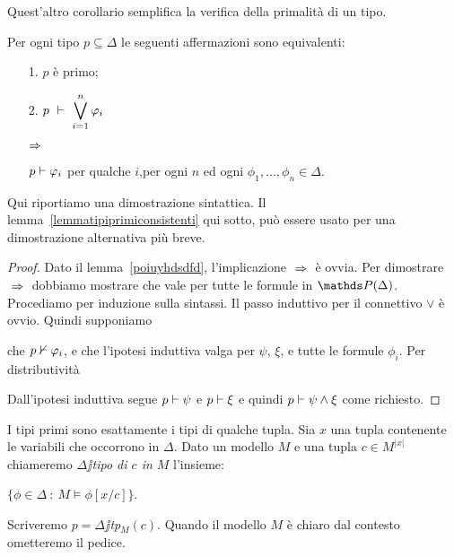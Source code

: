 Quest'altro corollario semplifica la verifica della primalit\`a di un tipo.


\begin{corollary}\label{lemma_primo_vs_completo}
Per ogni tipo $p\subseteq\Delta$ le seguenti affermazioni sono equivalenti:
\begin{itemize}
\item[1.] $p$ \`e primo;
\item[2.] $\displaystyle p\ \proves\ \bigvee^n_{i=1}\phi_i$\parbox{6ex}{\hfil$\Rightarrow$}$p\vdash\varphi_i$ per qualche $i$,\hfill per ogni $n$ ed ogni $\phi_1,\dots,\phi_n\in\Delta$.
\end{itemize}
\end{corollary}
Qui riportiamo una dimostrazione sintattica. Il lemma~\ref{lemmatipiprimiconsistenti} qui sotto, pu\`o essere usato per una dimostrazione alternativa pi\`u breve.
\begin{proof} Dato il lemma~\ref{poiuyhdsdfd}, l'implicazione $\;\Rightarrow\;$ \`e ovvia. Per dimostrare $\;\Rightarrow\;$ dobbiamo mostrare che  vale per tutte le formule in $\PP(\Delta)$. Procediamo per induzione sulla sintassi. Il passo induttivo per il connettivo $\vee$ \`e ovvio. Quindi supponiamo 


che $p\nvdash \varphi_i$, e che l'ipotesi induttiva valga per $\psi$, $\xi$, e tutte le formule $\phi_i$. Per distributivit\`a


Dall'ipotesi induttiva segue $p\vdash\psi$ e $p\vdash\xi$ e quindi  $p\vdash\psi\wedge\xi$ come richiesto.
\end{proof}

I tipi primi sono esattamente i tipi di qualche tupla. Sia $x$ una tupla contenente le variabili che occorrono in $\Delta$. Dato un modello $M$ e una tupla $c\in M^{|x|}$  chiameremo \emph{$\Delta\jj$tipo di $c$ in $M$\/} l'insieme:

\hspace*{20ex}%
$\Big\{\phi\in\Delta\ :\ M\models\phi[x/c]\Big\}$.

Scriveremo \emph{$p=\Delta\jj$tp$_M(c)$}. Quando il modello $M$ \`e chiaro dal contesto ometteremo il pedice.%


